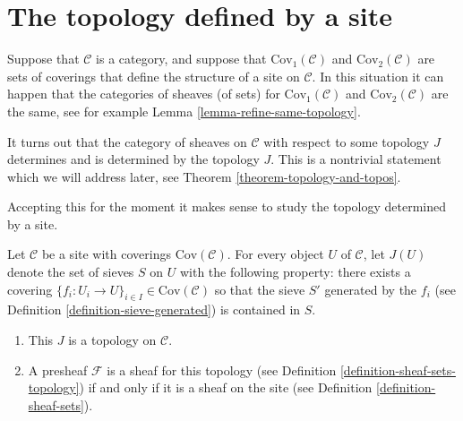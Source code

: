 \section{The topology defined by a site}
\label{section-topology-site}

\noindent
Suppose that $\mathcal{C}$ is a category, and suppose that
$\text{Cov}_1(\mathcal{C})$ and $\text{Cov}_2(\mathcal{C})$
are sets of coverings that define the structure of a site
on $\mathcal{C}$. In this situation it can happen that
the categories of sheaves (of sets) for $\text{Cov}_1(\mathcal{C})$
and $\text{Cov}_2(\mathcal{C})$ are the same, see for example
Lemma \ref{lemma-refine-same-topology}.

\medskip\noindent
It turns out that the category of sheaves on $\mathcal{C}$
with respect to some topology $J$
determines and is determined by the topology $J$.
This is a nontrivial statement which we will address later,
see Theorem \ref{theorem-topology-and-topos}.

\medskip\noindent
Accepting this for the moment it makes sense to study the
topology determined by a site.

\begin{lemma}
\label{lemma-site-gives-topology}
Let $\mathcal{C}$ be a site with coverings $\text{Cov}(\mathcal{C})$.
For every object $U$ of $\mathcal{C}$, let $J(U)$ denote
the set of sieves $S$ on $U$ with the following property:
there exists a covering
$\{f_i : U_i \to U\}_{i\in I} \in \text{Cov}(\mathcal{C})$
so that the sieve $S'$ generated by the $f_i$ (see Definition
\ref{definition-sieve-generated}) is contained in $S$.
\begin{enumerate}
\item This $J$ is a topology on $\mathcal{C}$.
\item A presheaf $\mathcal{F}$ is a sheaf for this topology
(see Definition \ref{definition-sheaf-sets-topology})
if and only if it is a sheaf on the site (see
Definition \ref{definition-sheaf-sets}).
\end{enumerate}
\end{lemma}

